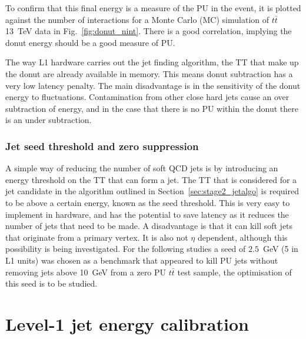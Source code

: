 
To confirm that this final energy is
a measure of the PU in the event, it is plotted against the number of
interactions for a Monte Carlo (MC) simulation of $t\bar{t}$ 13~TeV
data in Fig.~\ref{fig:donut_nint}. There is a good correlation,
implying the donut energy should be a good measure of PU.

The way L1 hardware carries out the jet finding algorithm, the TT that
make up the donut are already available in memory. This means donut
subtraction has a very low latency penalty. The main disadvantage is
in the sensitivity of the donut energy to fluctuations. Contamination
from other close hard jets cause an over subtraction of energy, and in
the case that there is no PU within the donut there is an under
subtraction. 

\subsubsection{Jet seed threshold and zero suppression}
A simple way of reducing the number of soft QCD jets is by introducing
an energy threshold on the TT that can form a jet. The TT that is
considered for a jet candidate in the algorithm outlined in
Section~\ref{sec:stage2_jetalgo} is required to be above a certain
energy, known as the seed threshold. This is very easy to implement in
hardware, and has the potential to save latency as it reduces the
number of jets that need to be made. A disadvantage is that it can
kill soft jets that originate from a primary vertex. It is also not
$\eta$ dependent, although this possibility is being investigated. For
the following studies a seed of $2.5$~GeV (5 in L1 units) was chosen
as a benchmark that appeared to kill PU jets without removing jets
above 10~GeV from a zero PU $t\bar{t}$ test sample, the optimisation
of this seed is to be studied. 



\section{Level-1 jet energy calibration}
\label{sec:l1jec}


